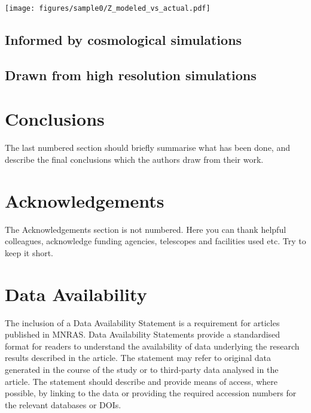\documentclass[fleqn,usenatbib]{mnras}
\begin{document}
\begin{figure*}
    \centering
    \texttt{[image: figures/sample0/Z\_modeled\_vs\_actual.pdf]}
    \label{f: idealized explanation}
\end{figure*}


\subsection{Informed by cosmological simulations}

\subsection{Drawn from high resolution simulations}

\section{Conclusions}

The last numbered section should briefly summarise what has been done, and describe
the final conclusions which the authors draw from their work.

\section*{Acknowledgements}

The Acknowledgements section is not numbered. Here you can thank helpful
colleagues, acknowledge funding agencies, telescopes and facilities used etc.
Try to keep it short.

\section*{Data Availability}

 
The inclusion of a Data Availability Statement is a requirement for articles published in MNRAS. Data Availability Statements provide a standardised format for readers to understand the availability of data underlying the research results described in the article. The statement may refer to original data generated in the course of the study or to third-party data analysed in the article. The statement should describe and provide means of access, where possible, by linking to the data or providing the required accession numbers for the relevant databases or DOIs.




\end{document}
